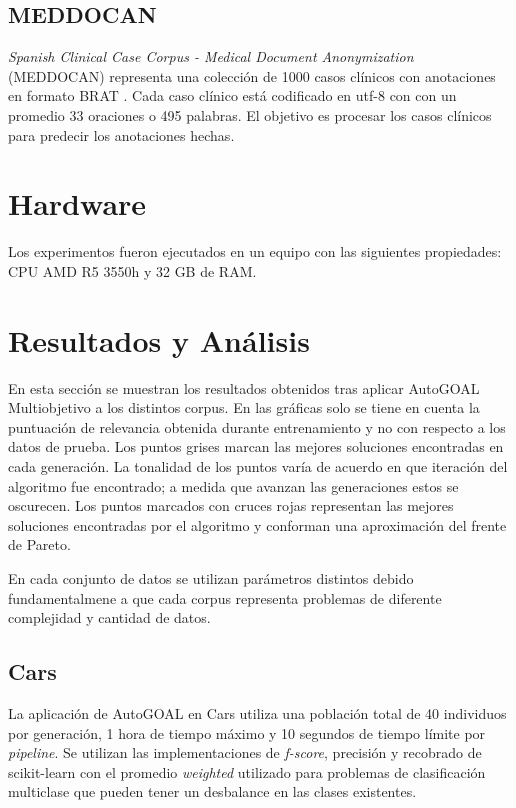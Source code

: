 \subsection{MEDDOCAN}

\textit{Spanish Clinical Case Corpus - Medical Document Anonymization} (MEDDOCAN)  representa una colecci\'on de 1000 casos cl\'inicos con anotaciones en formato BRAT . Cada caso cl\'inico est\'a codificado en utf-8 con con un promedio 33 oraciones o 495 palabras. El objetivo es procesar los casos cl\'inicos para predecir los anotaciones hechas.

\section{Hardware}
 Los experimentos fueron ejecutados en un equipo con las siguientes propiedades: CPU AMD R5 3550h y 32 GB de RAM.

\section{Resultados y An\'alisis}

En esta secci\'on se muestran los resultados obtenidos tras aplicar AutoGOAL Multiobjetivo a los distintos corpus. En las gr\'aficas solo se tiene en cuenta la puntuaci\'on de relevancia obtenida durante entrenamiento y no con respecto a los datos de prueba. Los puntos  grises marcan las mejores soluciones encontradas en cada generaci\'on.  La tonalidad de los puntos var\'ia de acuerdo en que iteraci\'on del algoritmo fue encontrado; a medida que avanzan las generaciones estos se oscurecen. Los puntos marcados con cruces rojas representan las mejores soluciones encontradas por el algoritmo y conforman una aproximaci\'on del frente de Pareto.

En cada conjunto de datos se utilizan par\'ametros distintos debido fundamentalmene a que cada corpus representa problemas de diferente complejidad y cantidad de datos.

\subsection{Cars}
La aplicaci\'on de AutoGOAL en Cars utiliza una poblaci\'on total de 40 individuos por generaci\'on, 1 hora de tiempo m\'aximo y 10 segundos de tiempo l\'imite por \textit{pipeline}. Se utilizan las implementaciones de \textit{f-score}, precisi\'on y recobrado de scikit-learn  con el promedio \textit{weighted} utilizado para problemas de clasificaci\'on multiclase que pueden tener un desbalance en las clases existentes.


